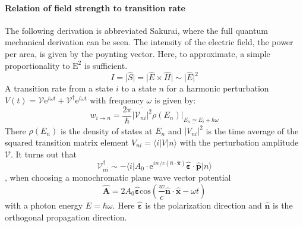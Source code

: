 \documentclass[twoside,openright,listof=numbered]{scrreprt}
\begin{document}
\paragraph{Relation of field strength to transition rate} The following derivation is abbreviated Sakurai\cite[chapter 5.7-5.8]{Sakurai_Napolitano_2017}, where the full quantum mechanical derivation can be seen.
The intensity of the electric field, the power per area, is given by the poynting vector. Here, to approximate, a simple proportionality to  $\mathrm{E^2}$ is sufficient.
\begin{equation*}
I =  \lvert  \hat{S} \rvert =  \lvert \hat{E} \times \hat{H} \rvert  \sim \lvert \hat{E} \rvert^2
\end{equation*}
A transition rate from a state $i$ to a state $n$ for a harmonic  perturbation $V(t) = \mathcal{V}\mathrm{e}^{i\omega t} + \mathcal{V}^\dagger \mathrm{e}^{i\omega t}$ with frequency $\omega$ is given by:\cite[chapter 5.7]{Sakurai_Napolitano_2017}
\begin{equation}\label{eq:transitionRate}
w_{i\rightarrow n} = \frac{2\pi}{\hbar}\overline{\lvert \mathcal{V}_{ni}\rvert^2}\rho(E_n)\vert_{E_n \simeq E_i + \hbar\omega}
\end{equation}
There $\rho(E_n)$ is the density of states at $E_n$ and $\overline{\lvert V_{ni}\rvert^2}$ is the time average of the squared transition matrix element $V_{ni} = \langle i\lvert V\rvert n \rangle$ with the perturbation amplitude $\mathcal{V}$. %
It turns out that 
\begin{equation}\mathcal{V}^\dagger_{ni} \sim -\langle i\lvert A_0\cdot \mathrm{e}^{iw/c\left(\hat{n}\cdot\mathbf{\hat{x}}\right)} \mathbf{\hat{\varepsilon}}\cdot\mathbf{\hat{p}}\rvert n \rangle
\end{equation}
, when choosing a monochromatic plane wave vector potential
\begin{equation*}\mathbf{\hat{A}} = 2A_0\mathbf{\hat{\varepsilon}}\mathrm{cos}\left(\frac{w}{c}\mathbf{\hat{n}\cdot \hat{x}}-\omega t\right)
\end{equation*} with a photon energy  $E =\hbar\omega$. Here $\mathbf{\hat{\varepsilon}}$ is the polarization direction and $\mathbf{\hat{n}}$ is the orthogonal propagation direction.\cite[chapter 5.7-5.8]{Sakurai_Napolitano_2017}
\end{document}
